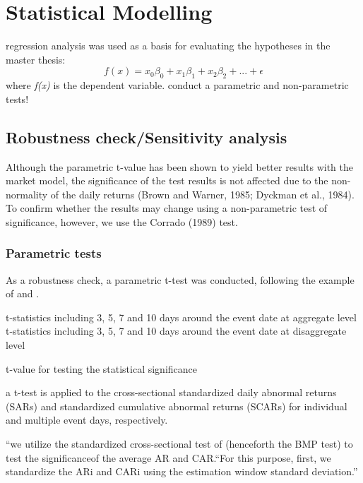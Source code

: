 \documentclass[12pt,a4paper]{article}
\begin{document}
\section{Statistical Modelling}
regression analysis was used as a basis for evaluating the hypotheses in the master thesis:
\begin{equation} \label{lin_reg_bias}
	f(x) = {x_0\beta_0 +x_1\beta_1 +x_2\beta_2 + ... +\epsilon} 
	\end{equation}
where \textit{f(x)} is the dependent variable.
conduct a parametric and non-parametric tests! 

\subsection{Robustness check/Sensitivity analysis}
Although the parametric t-value has been shown to yield better results with the market model, the significance of the test results is not affected due to the non-normality of the daily returns (Brown and Warner, 1985; Dyckman et al., 1984). To confirm whether the results may change using a non-parametric test of significance, however, we use the Corrado (1989) test. \citep[p.~12]{kumari_what_2022}



\subsubsection{Parametric tests}
As a robustness check, a parametric t-test was conducted, following the example of \cite{boubaker_heterogeneous_2022} and \cite{ghasseminejad_impact_2021}. 

t-statistics including 3, 5, 7 and 10 days around the event date at aggregate level \citep[p.~6]{gu_how_2021}
t-statistics including 3, 5, 7 and 10 days around the event date at disaggregate level \citep[p.~7]{gu_how_2021}

t-value for testing the statistical significance \citep[p.~3]{hassan_border_2022}

a t-test is applied to the cross-sectional standardized daily abnormal returns (SARs) and standardized cumulative abnormal returns (SCARs) for individual and multiple event days, respectively. \citep[p.~5]{kamal_impact_2023}

“we utilize the standardized cross-sectional test of \citep{boehmer_event-study_1991}(henceforth the BMP test) to test the significanceof the average AR and CAR.“For this purpose, first, we standardize the ARi and CARi using the estimation window standard deviation.” \cite[p. ~5]{kamal_impact_2023}
\end{document}

